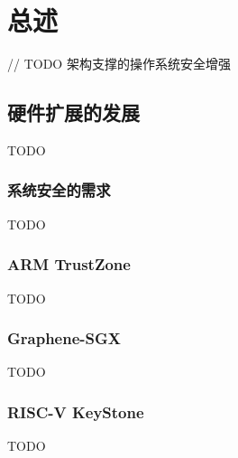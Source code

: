 \chapter{总述} %

\label{Chapter1} %

// TODO 架构支撑的操作系统安全增强

\section{硬件扩展的发展}
TODO
\subsection{系统安全的需求}
TODO
\subsection{ARM TrustZone}
TODO
\subsection{Graphene-SGX}
TODO
\subsection{RISC-V KeyStone}
TODO

